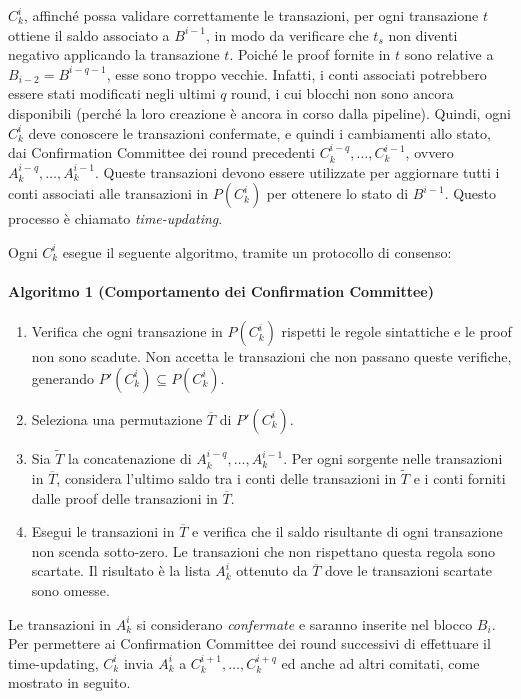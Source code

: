 $C_k^i$, affinché possa validare correttamente le transazioni, per ogni transazione $t$ ottiene il saldo associato a $B^{i-1}$, in modo da verificare che $t_s$ non diventi negativo applicando la transazione $t$. Poiché le proof fornite in $t$ sono relative a $B_{i-2} = B^{i-q-1}$, esse sono troppo vecchie. Infatti, i conti associati potrebbero essere stati modificati negli ultimi $q$ round, i cui blocchi non sono ancora disponibili (perché la loro creazione è ancora in corso dalla pipeline). Quindi, ogni $C_k^i$ deve conoscere le transazioni confermate, e quindi i cambiamenti allo stato, dai Confirmation Committee dei round precedenti $C_k^{i-q}, \dots, C_k^{i-1}$, ovvero $A_k^{i-q}, \dots, A_k^{i-1}$. Queste transazioni devono essere utilizzate per aggiornare tutti i conti associati alle transazioni in $P(C_k^i)$ per ottenere lo stato di $B^{i-1}$. Questo processo è chiamato \emph{time-updating}.

Ogni $C_k^i$ esegue il seguente algoritmo, tramite un protocollo di consenso:

\paragraph*{Algoritmo 1 (Comportamento dei Confirmation Committee)}
\begin{enumerate}
	\item Verifica che ogni transazione in $P(C_k^i)$ rispetti le regole sintattiche e le proof non sono scadute. Non accetta le transazioni che non passano queste verifiche, generando $P'(C_k^i) \subseteq P(C_k^i)$.
	\item Seleziona una permutazione $\overline{T}$ di $P'(C_k^i)$.
	\item Sia $\widetilde{T}$ la concatenazione di $A_k^{i-q}, \dots, A_k^{i-1}$. Per ogni sorgente nelle transazioni in $\overline{T}$, considera l'ultimo saldo tra i conti delle transazioni in $\widetilde{T}$ e i conti forniti dalle proof delle transazioni in $\overline{T}$.
	\item Esegui le transazioni in $\overline{T}$ e verifica che il saldo risultante di ogni transazione non scenda sotto-zero. Le transazioni che non rispettano questa regola sono scartate. Il risultato è la lista $A_k^i$ ottenuto da $\overline{T}$ dove le transazioni scartate sono omesse.	
\end{enumerate}

Le transazioni in $A_k^i$ si considerano \emph{confermate} e saranno inserite nel blocco $B_i$. Per permettere ai Confirmation Committee dei round successivi di effettuare il time-updating, $C_k^i$ invia $A_k^i$ a $C_k^{i+1}, \dots, C_k^{i+q}$ ed anche ad altri comitati, come mostrato in seguito.

